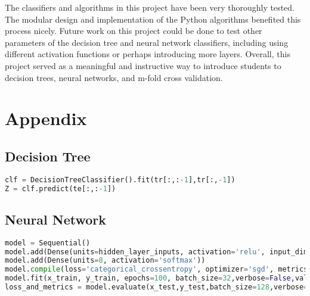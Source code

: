 \documentclass[paper=a4, fontsize=11pt,twoside]{scrartcl}	%
\begin{document}
The classifiers and algorithms in this project have been very thoroughly tested. The modular design and implementation of the Python algorithms benefited this process nicely. Future work on this project could be done to test other parameters of the decision tree and neural network classifiers, including using different activation functions or perhaps introducing more layers. Overall, this project served as a meaningful and instructive way to introduce students to decision trees, neural networks, and m-fold cross validation.





\appendix
\section{Appendix}

\subsection{Decision Tree}
\label{app:dt}
\begin{lstlisting}[caption={Implementation of decision tree},captionpos=b,language=Python,breaklines]
clf = DecisionTreeClassifier().fit(tr[:,:-1],tr[:,-1])
Z = clf.predict(te[:,:-1])
\end{lstlisting}


\subsection{Neural Network}
\label{app:nn}
\begin{lstlisting}[caption={Implementation of 3-layer neural network using \texttt{keras} with 9 inputs, variable nodes in the hidden layer, and 8 outputs using one-hot encoding},captionpos=b,language=Python,breaklines]
model = Sequential()
model.add(Dense(units=hidden_layer_inputs, activation='relu', input_dim=9))
model.add(Dense(units=8, activation='softmax'))
model.compile(loss='categorical_crossentropy', optimizer='sgd', metrics=['accuracy'])
model.fit(x_train, y_train, epochs=100, batch_size=32,verbose=False,validation_split=1/9)
loss_and_metrics = model.evaluate(x_test,y_test,batch_size=128,verbose=False)
\end{lstlisting}
\end{document}
